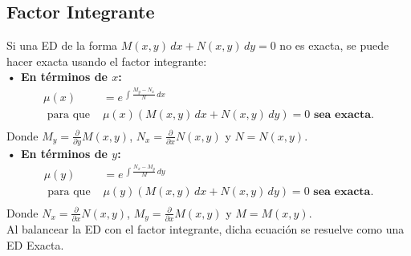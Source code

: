 \documentclass[letterpaper, 12pt]{article}
\begin{document}
\begin{justify}
        \subsection*{Factor Integrante}
        \justify
        Si una ED de la forma \(M(x,y)\, dx+N(x,y)\, dy=0\) no es exacta, se puede hacer exacta usando el factor integrante:
        \\\newline
        \textbf{• En términos de \(x\):}
        {\large\begin{equation*}
            \begin{aligned}
                \mu(x)&=e^{\,\int \frac{M_y-N_x}{N}\, dx}\\[5pt] 
                \text{ para que }&\mu(x)\left(M(x,y)\, dx+N(x,y)\, dy\right)=0 \textbf{ sea exacta.}\\[5pt]
            \end{aligned}
        \end{equation*}}
        Donde \(M_y=\frac{\partial}{\partial y}M(x,y)\), \(N_x=\frac{\partial}{\partial x}N(x,y)\) y \(N=N(x,y)\).
        \\\newline
        \textbf{• En términos de \(y\):}
        {\large\begin{equation*}
            \begin{aligned}
                \mu(y)&=e^{\,\int \frac{N_x-M_y}{M}\, dy}\\[5pt]
                \text{ para que }&\mu(y)\left(M(x,y)\, dx+N(x,y)\, dy\right)=0 \textbf{ sea exacta.}\\[5pt]
            \end{aligned}
        \end{equation*}}
        Donde \(N_x=\frac{\partial}{\partial x}N(x,y)\), \(M_y=\frac{\partial}{\partial x}M(x,y)\) y \(M=M(x,y)\).
        \\\newline
        Al balancear la ED con el factor integrante, dicha ecuación se resuelve como una ED Exacta.    

\end{justify}
\end{document}
